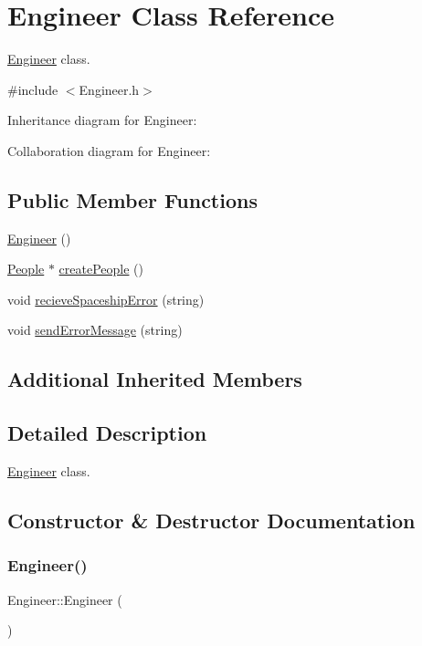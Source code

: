 \hypertarget{classEngineer}{}\section{Engineer Class Reference}
\label{classEngineer}


\hyperlink{classEngineer}{Engineer} class.  




{\ttfamily \#include $<$Engineer.\+h$>$}



Inheritance diagram for Engineer\+:


Collaboration diagram for Engineer\+:
\subsection*{Public Member Functions}
\begin{DoxyCompactItemize}
\item 
\hyperlink{classEngineer_acf0604e3e44a09583b420c729b651ad7}{Engineer} ()
\item 
\hyperlink{classPeople}{People} $\ast$ \hyperlink{classEngineer_aaa9d760e22cab80ec283b2a085782feb}{create\+People} ()
\item 
void \hyperlink{classEngineer_acc86ce6b4b1388be8ebacc685f9e6233}{recieve\+Spaceship\+Error} (string)
\item 
void \hyperlink{classEngineer_ae60806f33b7f226891dbb7ad9b8a0c0b}{send\+Error\+Message} (string)
\end{DoxyCompactItemize}
\subsection*{Additional Inherited Members}


\subsection{Detailed Description}
\hyperlink{classEngineer}{Engineer} class. 

\subsection{Constructor \& Destructor Documentation}
\mbox{\label{classEngineer_acf0604e3e44a09583b420c729b651ad7}} 
\subsubsection{\texorpdfstring{Engineer()}{Engineer()}}
{\footnotesize\ttfamily Engineer\+::\+Engineer (\begin{DoxyParamCaption}{ }\end{DoxyParamCaption})\hspace{0.3cm}{\ttfamily [inline]}}


